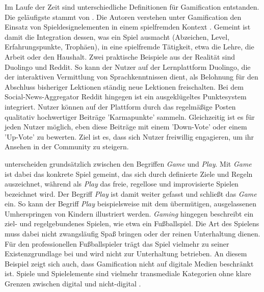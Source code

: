 Im Laufe der Zeit sind unterschiedliche Definitionen für Gamification entstanden. Die geläufigste stammt von . Die Autoren verstehen unter Gamification den Einsatz von Spieldesignelementen in einem spielfremden Kontext \cite{deterding_game_2011}. Gemeint ist damit die Integration dessen, was ein Spiel ausmacht (Abzeichen, Level, Erfahrungspunkte, Trophäen), in eine spielfremde Tätigkeit, etwa die Lehre, die Arbeit oder den Haushalt. Zwei praktische Beispiele aus der Realität sind Duolingo und Reddit. So kann der Nutzer auf der Lernplattform Duolingo, die der interaktiven Vermittlung von Sprachkenntnissen dient, als Belohnung für den Abschluss bisheriger Lektionen ständig neue Lektionen freischalten. Bei dem Social-News-Aggregator Reddit hingegen ist ein ausgeklügeltes Punktesystem integriert. Nutzer können auf der Plattform durch das regelmäßige Posten qualitativ hochwertiger Beiträge 'Karmapunkte' sammeln. Gleichzeitig ist es für jeden Nutzer möglich, eben diese Beiträge mit einem 'Down-Vote' oder einem 'Up-Vote' zu bewerten. Ziel ist es, dass sich Nutzer freiwillig engagieren, um ihr Ansehen in der Community zu steigern.

 unterscheiden grundsätzlich zwischen den Begriffen \textit{Game} und \textit{Play}. Mit \textit{Game} ist dabei das konkrete Spiel gemeint, das sich durch definierte Ziele und Regeln auszeichnet, während als \textit{Play} das freie, regellose und improvisierte Spielen bezeichnet wird. Der Begriff \textit{Play} ist damit weiter gefasst und schließt das \textit{Game} ein. So kann der Begriff \textit{Play} beispielsweise mit dem übermütigen, ausgelassenen Umherspringen von Kindern illustriert werden. \textit{Gaming} hingegen beschreibt ein ziel- und regelgebundenes Spielen, wie etwa ein Fußballspiel. Die Art des Spielens muss dabei nicht zwangsläufig Spaß bringen oder der reinen Unterhaltung dienen. Für den professionellen Fußballspieler trägt das Spiel vielmehr zu seiner Existenzgrundlage bei und wird nicht zur Unterhaltung betrieben. An diesem Beispiel zeigt sich auch, dass Gamification nicht auf digitale Medien beschränkt ist.  Spiele und Spielelemente sind vielmehr transmediale Kategorien ohne klare Grenzen zwischen digital und nicht-digital \cite{deterding_game_2011}.

